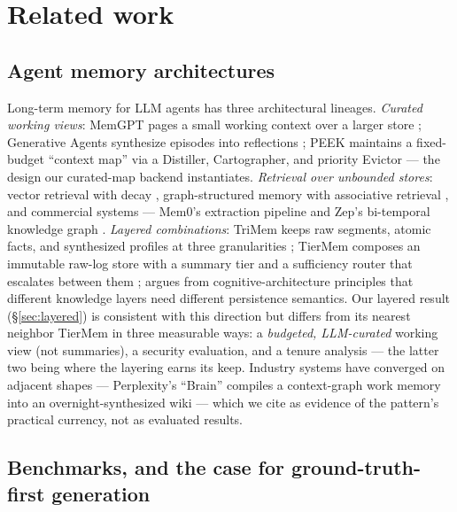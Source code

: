 \section{Related work}
\label{sec:related}

\subsection{Agent memory architectures}

Long-term memory for LLM agents has three architectural lineages.
\emph{Curated working views}: MemGPT pages a small working context over a
larger store \citep{packer2023memgpt}; Generative Agents synthesize episodes
into reflections \citep{park2023generative}; PEEK maintains a fixed-budget
``context map'' via a Distiller, Cartographer, and priority Evictor
\citep{gu2026peek} --- the design our curated-map backend instantiates.
\emph{Retrieval over unbounded stores}: vector retrieval with decay
\citep{zhong2023memorybank}, graph-structured memory with associative
retrieval \citep{gutierrez2024hipporag,xu2025amem}, and commercial systems
--- Mem0's extraction pipeline \citep{chhikara2025mem0} and Zep's bi-temporal
knowledge graph \citep{rasmussen2025zep}. \emph{Layered combinations}:
TriMem keeps raw segments, atomic facts, and synthesized profiles at three
granularities \citep{trimem2026}; TierMem composes an immutable raw-log
store with a summary tier and a sufficiency router that escalates between
them \citep{zhu2026tiermem}; \citet{roynard2026knowledgelayer} argues from
cognitive-architecture principles that different knowledge layers need
different persistence semantics. Our layered result (\S\ref{sec:layered}) is
consistent with this direction but differs from its nearest neighbor TierMem
in three measurable ways: a \emph{budgeted, LLM-curated} working view (not
summaries), a security evaluation, and a tenure analysis --- the latter two
being where the layering earns its keep. Industry systems have converged on
adjacent shapes --- Perplexity's ``Brain'' compiles a context-graph work
memory into an overnight-synthesized wiki \citep{perplexity2026brain} ---
which we cite as evidence of the pattern's practical currency, not as
evaluated results.

\subsection{Benchmarks, and the case for ground-truth-first generation}
\label{sec:related-benchmarks}

